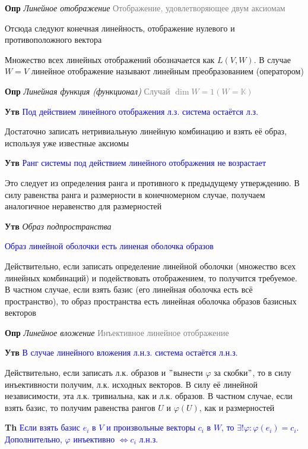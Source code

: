 \textbf{Опр} \textit{Линейное отображение} \textcolor{gray}{Отображение, удовлетворяющее двум аксиомам}

Отсюда следуют конечная линейность, отображение нулевого и противоположного вектора

Множество всех линейных отображений обозначается как $L(V, W)$.
В случае $W = V$ линейное отображение называют линейным преобразованием (оператором)

\textbf{Опр} \textit{Линейная функция (функционал)} \textcolor{gray}{Случай $\dim W = 1 (W = \mathbb{K})$}

\textbf{Утв} \textcolor{blue}{Под действием линейного отображения л.з. система остаётся л.з.}

Достаточно записать нетривиальную линейную комбинацию и взять её образ, используя уже известные аксиомы

\textbf{Утв} \textcolor{blue}{Ранг системы под действием линейного отображения не возрастает}

Это следует из определения ранга и противного к предыдущему утверждению.
В силу равенства ранга и размерности в конечномерном случае, получаем аналогичное неравенство для размерностей

\textbf{Утв} \textit{Образ подпространства}

\textcolor{blue}{Образ линейной оболочки есть линеная оболочка образов}

Действительно, если записать определение линейной оболочки (множество всех линейных комбинаций) и подействовать
отображением, то получится требуемое.
В частном случае, если взять базис (его линейная оболочка есть всё пространство), то образ пространства есть линейная
оболочка образов базисных векторов

\textbf{Опр} \textit{Линейное вложение} \textcolor{gray}{Инъективное линейное отображение}

\textbf{Утв} \textcolor{blue}{В случае линейного вложения л.н.з. система остаётся л.н.з.}

Действительно, если записать л.к. образов и \("\)вынести $\varphi$ за скобки\("\), то в силу инъективности
получим, л.к. исходных векторов.
В силу её линейной независимости, эта л.к. тривиальна, как и л.к. образов.
В частном случае, если взять базис, то получим равенства рангов $U$ и $\varphi (U)$, как и размерностей

\textbf{Th} \textcolor{blue}{Если взять базис $e_i$ в $V$ и произвольные векторы $c_i$ в $W$, то
    $\exists ! \varphi: \varphi(e_i) = c_i$. Дополнительно, $\varphi$ инъективно $\Leftrightarrow c_i$ л.н.з.}

